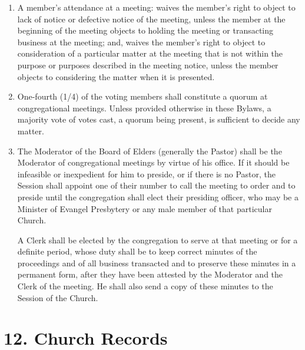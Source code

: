 \documentclass[
]{book}
\begin{document}
\begin{enumerate}
\item
  A member's attendance at a meeting: waives the member's right to object to lack of notice or defective notice of the meeting, unless the member at the beginning of the meeting objects to holding the meeting or transacting business at the meeting; and, waives the member's right to object to consideration of a particular matter at the meeting that is not within the purpose or purposes described in the meeting notice, unless the member objects to considering the matter when it is presented.
\item
  One-fourth (1/4) of the voting members shall constitute a quorum at congregational meetings. Unless provided otherwise in these Bylaws, a majority vote of votes cast, a quorum being present, is sufficient to decide any matter.
\item
  The Moderator of the Board of Elders (generally the Pastor) shall be the Moderator of congregational meetings by virtue of his office. If it should be infeasible or inexpedient for him to preside, or if there is no Pastor, the Session shall appoint one of their number to call the meeting to order and to preside until the congregation shall elect their presiding officer, who may be a Minister of Evangel Presbytery or any male member of that particular Church.

  A Clerk shall be elected by the congregation to serve at that meeting or for a definite period, whose duty shall be to keep correct minutes of the proceedings and of all business transacted and to preserve these minutes in a permanent form, after they have been attested by the Moderator and the Clerk of the meeting. He shall also send a copy of these minutes to the Session of the Church.
\end{enumerate}

\hypertarget{church-records}{%
\section*{12. Church Records}\label{church-records}}
\end{document}
